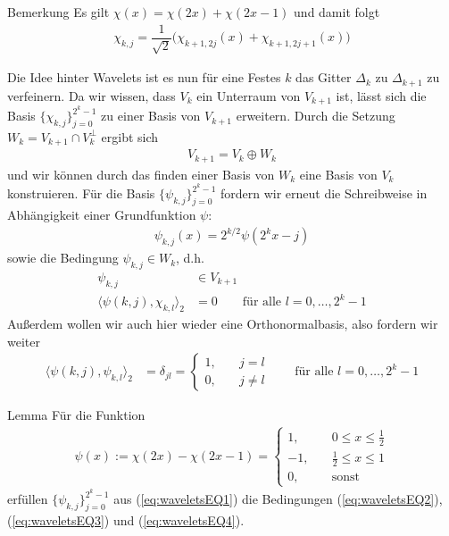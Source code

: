 \begin{colbox}{Bemerkung}
  Es gilt $\chi(x) = \chi(2x) + \chi(2x-1)$ und damit folgt
  \begin{align*}
    \chi_{k,j} 
    = \dfrac{1}{\sqrt{2}}\Big(\chi_{k+1,2j}(x) + \chi_{k+1,2j+1}(x)\Big)
  \end{align*}
\end{colbox}

Die Idee hinter Wavelets ist es nun für eine Festes $k$ das Gitter $\Delta_k$ zu $\Delta_{k+1}$ zu verfeinern. 
Da wir wissen, dass $V_k$ ein Unterraum von $V_{k+1}$ ist, 
lässt sich die Basis $\{\chi_{k,j}\}_{j=0}^{2^k-1}$ zu einer Basis 
von $V_{k+1}$ erweitern. Durch die Setzung $W_k = V_{k+1} \cap V_k^\perp$ ergibt sich 
%
\begin{align*}
  V_{k+1} = V_k \oplus W_k
\end{align*}
%
und wir können durch das finden einer Basis von $W_k$ eine Basis von $V_k$ konstruieren. Für die Basis 
$\{\psi_{k,j}\}_{j=0}^{2^k-1}$ fordern wir erneut die Schreibweise in Abhängigkeit einer Grundfunktion $\psi$:
%
\begin{align*}
  \psi_{k,j}(x) = 2^{k/2}\psi(2^kx-j) 
  \tag{1} \label{eq:waveletsEQ1}
\end{align*}
%
sowie die Bedingung $\psi_{k,j}\in W_k$, d.h. 
%
\begin{align*}
  \psi_{k,j} &\in V_{k+1} 
  \tag{2}\label{eq:waveletsEQ2}\\
  \langle\psi(k,j), \chi_{k,l}\rangle_2 &= 0 \qquad \text{für alle } l=0,\dots,2^k-1
  \tag{3}\label{eq:waveletsEQ3}
\end{align*}
%
Außerdem wollen wir auch hier wieder eine Orthonormalbasis, also fordern wir weiter 
%
\begin{align*}
  \langle\psi(k,j), \psi_{k,l}\rangle_2 &= \delta_{jl} = \begin{cases}
    1, \quad & j=l \\
    0, \quad & j\neq l
  \end{cases} \qquad \text{für alle } l=0,\dots,2^k-1
  \tag{4}\label{eq:waveletsEQ4}
\end{align*}
%
\begin{colbox}{Lemma}
  Für die Funktion
  \begin{align*}
    \psi(x) := \chi(2x) - \chi(2x-1) = \begin{cases}
      1, \quad & 0\leq x\leq \tfrac{1}{2}\\
      -1, \quad & \tfrac{1}{2}\leq x\leq 1 \\
      0, \quad & \text{sonst}
    \end{cases}
  \end{align*}
  erfüllen $\{\psi_{k,j}\}_{j=0}^{2^k-1}$ aus (\ref{eq:waveletsEQ1}) die 
  Bedingungen (\ref{eq:waveletsEQ2}), (\ref{eq:waveletsEQ3}) und (\ref{eq:waveletsEQ4}).
\end{colbox}

